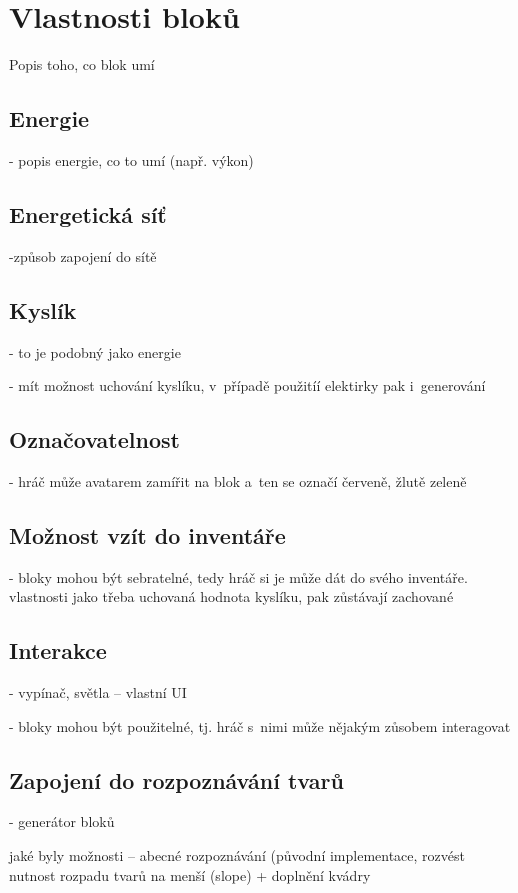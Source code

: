 
\section{Vlastnosti bloků}

Popis toho, co blok umí


\subsection{Energie}

- popis energie, co to umí (např. výkon)

\subsection{Energetická síť}

-způsob zapojení do sítě

\subsection{Kyslík}

- to je podobný jako energie

- mít možnost uchování kyslíku, v~případě použitíí elektirky pak i~generování


\subsection{Označovatelnost}

- hráč může avatarem zamířit na blok a~ten se označí červeně, žlutě zeleně



\subsection{Možnost vzít do inventáře}

- bloky mohou být sebratelné, tedy hráč si je může dát do svého inventáře. vlastnosti jako třeba uchovaná hodnota kyslíku, pak zůstávají zachované


\subsection{Interakce}

- vypínač, světla -- vlastní UI


- bloky mohou být použitelné, tj. hráč s~nimi může nějakým zůsobem interagovat


\subsection{Zapojení do rozpoznávání tvarů}

- generátor bloků

jaké byly možnosti -- abecné rozpoznávání (původní implementace, rozvést nutnost rozpadu tvarů na menší (slope) + doplnění kvádry

